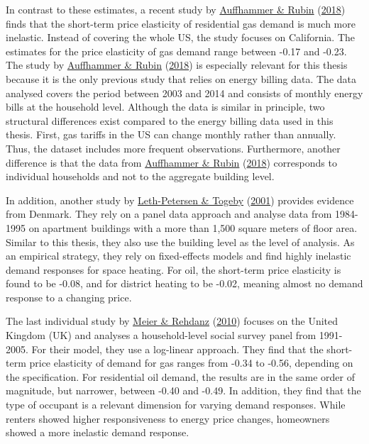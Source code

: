 \documentclass[12pt,twoside]{reedthesis}
\begin{document}
In contrast to these estimates, a recent study by \protect\hyperlink{ref-auffhammer_rubin18}{Auffhammer \& Rubin} (\protect\hyperlink{ref-auffhammer_rubin18}{2018}) finds that the short-term price elasticity of residential gas demand is much more inelastic. Instead of covering the whole US, the study focuses on California. The estimates for the price elasticity of gas demand range between -0.17 and -0.23. The study by \protect\hyperlink{ref-auffhammer_rubin18}{Auffhammer \& Rubin} (\protect\hyperlink{ref-auffhammer_rubin18}{2018}) is especially relevant for this thesis because it is the only previous study that relies on energy billing data. The data analysed covers the period between 2003 and 2014 and consists of monthly energy bills at the household level. Although the data is similar in principle, two structural differences exist compared to the energy billing data used in this thesis. First, gas tariffs in the US can change monthly rather than annually. Thus, the dataset includes more frequent observations. Furthermore, another difference is that the data from \protect\hyperlink{ref-auffhammer_rubin18}{Auffhammer \& Rubin} (\protect\hyperlink{ref-auffhammer_rubin18}{2018}) corresponds to individual households and not to the aggregate building level.

In addition, another study by \protect\hyperlink{ref-leth-petersen_togeby01}{Leth-Petersen \& Togeby} (\protect\hyperlink{ref-leth-petersen_togeby01}{2001}) provides evidence from Denmark. They rely on a panel data approach and analyse data from 1984-1995 on apartment buildings with a more than 1,500 square meters of floor area. Similar to this thesis, they also use the building level as the level of analysis. As an empirical strategy, they rely on fixed-effects models and find highly inelastic demand responses for space heating. For oil, the short-term price elasticity is found to be -0.08, and for district heating to be -0.02, meaning almost no demand response to a changing price.

The last individual study by \protect\hyperlink{ref-meier_rehdanz10}{Meier \& Rehdanz} (\protect\hyperlink{ref-meier_rehdanz10}{2010}) focuses on the United Kingdom (UK) and analyses a household-level social survey panel from 1991-2005. For their model, they use a log-linear approach. They find that the short-term price elasticity of demand for gas ranges from -0.34 to -0.56, depending on the specification. For residential oil demand, the results are in the same order of magnitude, but narrower, between -0.40 and -0.49. In addition, they find that the type of occupant is a relevant dimension for varying demand responses. While renters showed higher responsiveness to energy price changes, homeowners showed a more inelastic demand response.
\end{document}
